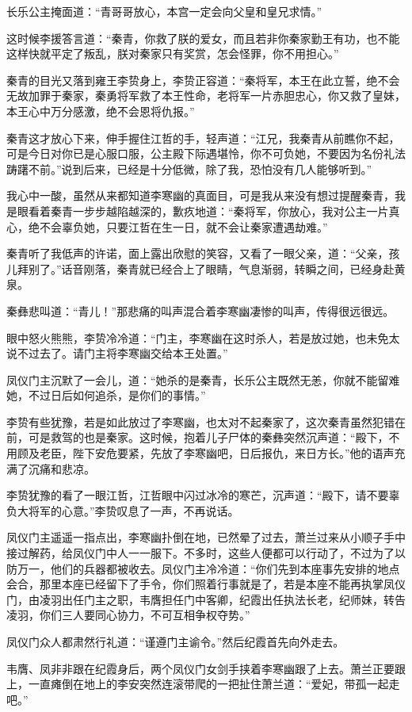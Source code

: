 长乐公主掩面道：“青哥哥放心，本宫一定会向父皇和皇兄求情。”

这时候李援答言道：“秦青，你救了朕的爱女，而且若非你秦家勤王有功，也不能这样快就平定了叛乱，朕对秦家只有奖赏，怎会怪罪，你不用担心。”

秦青的目光又落到雍王李贽身上，李贽正容道：“秦将军，本王在此立誓，绝不会无故加罪于秦家，秦勇将军救了本王性命，老将军一片赤胆忠心，你又救了皇妹，本王心中万分感激，绝不会恩将仇报。”

秦青这才放心下来，伸手握住江哲的手，轻声道：“江兄，我秦青从前瞧你不起，可是今日对你已是心服口服，公主殿下际遇堪怜，你不可负她，不要因为名份礼法踌躇不前。”说到后来，已经是十分低微，除了我，恐怕没有几人能够听到。”

我心中一酸，虽然从来都知道李寒幽的真面目，可是我从来没有想过提醒秦青，我是眼看着秦青一步步越陷越深的，歉疚地道：“秦将军，你放心，我对公主一片真心，绝不会辜负她，只要江哲在生一日，就不会让秦家遭遇劫难。”

秦青听了我低声的许诺，面上露出欣慰的笑容，又看了一眼父亲，道：“父亲，孩儿拜别了。”话音刚落，秦青就已经合上了眼睛，气息渐弱，转瞬之间，已经身赴黄泉。

秦彝悲叫道：“青儿！”那悲痛的叫声混合着李寒幽凄惨的叫声，传得很远很远。

眼中怒火熊熊，李贽冷冷道：“门主，李寒幽在这时杀人，若是放过她，也未免太说不过去了。请门主将李寒幽交给本王处置。”

凤仪门主沉默了一会儿，道：“她杀的是秦青，长乐公主既然无恙，你就不能留难她，不过日后如何追杀，是你们的事情。”

李贽有些犹豫，若是如此放过了李寒幽，也太对不起秦家了，这次秦青虽然犯错在前，可是救驾的也是秦家。这时候，抱着儿子尸体的秦彝突然沉声道：“殿下，不用顾及老臣，陛下安危要紧，先放了李寒幽吧，日后报仇，来日方长。”他的语声充满了沉痛和悲凉。

李贽犹豫的看了一眼江哲，江哲眼中闪过冰冷的寒芒，沉声道：“殿下，请不要辜负大将军的心意。”李贽叹息了一声，不再说话。

凤仪门主遥遥一指点出，李寒幽扑倒在地，已然晕了过去，萧兰过来从小顺子手中接过解药，给凤仪门中人一一服下。不多时，这些人便都可以行动了，不过为了以防万一，他们的兵器都被收去。凤仪门主冷冷道：“你们先到本座事先安排的地点会合，那里本座已经留下了手令，你们照着行事就是了，若是本座不能再执掌凤仪门，由凌羽出任门主之职，韦膺担任门中客卿，纪霞出任执法长老，纪师妹，转告凌羽，你们三人要同心协力，不可互相争权夺势。”

凤仪门众人都肃然行礼道：“谨遵门主谕令。”然后纪霞首先向外走去。

韦膺、凤非非跟在纪霞身后，两个凤仪门女剑手挟着李寒幽跟了上去。萧兰正要跟上，一直瘫倒在地上的李安突然连滚带爬的一把扯住萧兰道：“爱妃，带孤一起走吧。”


